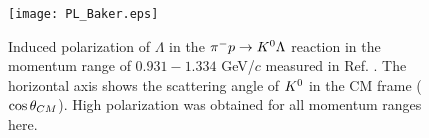 \begin{comment}
We requested a 34-day beam time, including a 29-day production run and 5-day commissioning and calibration runs, as the first stage to measure the differential cross-sections and the analyzing power by accumulating 50 M momentum-tagged beam $\Lambda$s. We also requested an additional 34-day beam time as the second stage, including the production, commissioning, and calibration runs with the same ratio to measure the depolarization and improve the differential cross-section accuracy and analyzing power measurements. Since the momentum dependence of the differential cross-section is expected to become large toward the $\SN$ threshold range \cite{Miwa-LpProp}, the differential cross-section will be measured with the beam $\Lambda$ momentum step of $dp_{\Lambda}=50$ MeV/$c$. The analyzing power and depolarization will be measured with the beam $\Lambda$ momentum step of $dp_{\Lambda}=100$ MeV/$c$. 
\end{comment}


\begin{figure}[!h]
  \begin{center}
   \texttt{[image: PL\_Baker.eps]}
   \caption{Induced polarization of $\Lambda$ in the $\pi^- p \to K^0 \Lambda$ reaction in the momentum range of $0.931-1.334$ GeV/$c$ measured in Ref. \cite{Baker}. The horizontal axis shows the scattering angle of $K^{0}$ in the CM frame ($\cos{\theta}_{CM}$). High polarization was obtained for all momentum ranges here.}
   \label{fig-PL_Baker}
 \end{center}
\end{figure}

\begin{comment}
\begin{figure}[!h]
  \begin{center}
   \texttt{[image: E86setup.png]}
   \caption{Experimental setup of the J-PARC E86 \cite{Miwa-LpProp}. To accurately measure the beam timing and momentum, beam timing hodoscope BH1 and beam fiber tracker BFT-U will be installed upstream of the D magnet, and BFT-D and BH2 will be installed downstream of the magnet. To measure the beam position at the LH$_{2}$ target, VFT will be installed just upstream of the target.}
   \label{fig-E86setup}
 \end{center}
\end{figure}
\end{comment}

%
